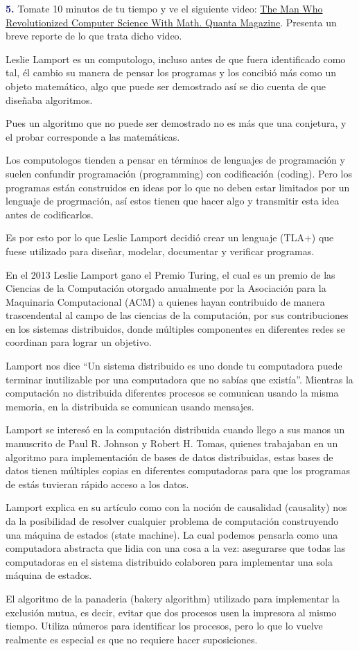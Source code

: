 \newpage
\textbf{\textcolor{MidnightBlue}{5.}} Tomate 10 minutos de
tu tiempo y ve el siguiente video:
\href{https://www.youtube.com/watch?v=rkZzg7Vowao}{The Man Who Revolutionized Computer Science With Math. Quanta Magazine}.
Presenta un breve reporte de lo que trata dicho video.

Leslie Lamport es un computologo, incluso antes de que fuera identificado
como tal, él cambio su manera de pensar los programas y los concibió más
como un objeto matemático, algo que puede ser demostrado así se dio cuenta
de que diseñaba algoritmos.

Pues un algoritmo que no puede ser demostrado no es más que una conjetura,
y el probar corresponde a las matemáticas.

Los computologos tienden a pensar en términos de lenguajes de programación y
suelen confundir programación (programming) con codificación (coding). Pero
los programas están construidos en ideas por lo que no deben estar limitados
por un lenguaje de progrmación, así estos tienen que hacer algo y transmitir
esta idea antes de codificarlos.

Es por esto por lo que Leslie Lamport decidió crear un lenguaje (TLA+) que fuese
utilizado para diseñar, modelar, documentar y verificar programas.


En el 2013 Leslie Lamport gano el Premio Turing, el cual es un premio de las
Ciencias de la Computación otorgado anualmente por la Asociación para la
Maquinaria Computacional (ACM) a quienes hayan contribuido de manera trascendental
al campo de las ciencias de la computación, por sus contribuciones en los sistemas
distribuidos, donde múltiples componentes en diferentes redes se coordinan para
lograr un objetivo.

Lamport nos dice “Un sistema distribuido es uno donde tu computadora puede
terminar inutilizable por una computadora que no sabías que existía”.
Mientras la computación no distribuida diferentes procesos se comunican usando
la misma memoria, en la distribuida se comunican usando mensajes.

Lamport se interesó en la computación distribuida cuando llego a sus manos un
manuscrito de Paul R. Johnson y Robert H. Tomas, quienes trabajaban en un algoritmo
para implementación de bases de datos distribuidas, estas bases de datos tienen
múltiples copias en diferentes computadoras para que los programas de estás
tuvieran rápido acceso a los datos.

Lamport explica en su artículo como con la noción de causalidad (causality)
nos da la posibilidad de resolver cualquier problema de computación construyendo
una máquina de estados (state machine). La cual podemos pensarla como una computadora
abstracta que lidia con una cosa a la vez: asegurarse que todas las computadoras
en el sistema distribuido colaboren para implementar una sola máquina de estados.


El algoritmo de la panaderia (bakery algorithm) utilizado para implementar
la exclusión mutua, es decir, evitar que dos procesos usen la impresora
al mismo tiempo. Utiliza números para identificar los procesos, pero lo que
lo vuelve realmente es especial es que no requiere hacer suposiciones.


